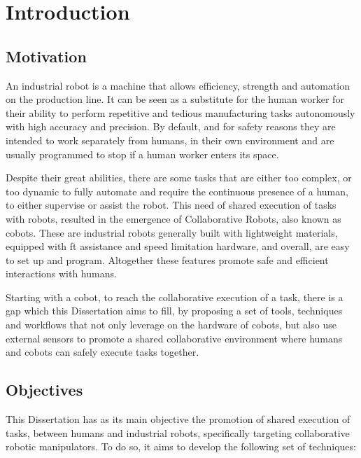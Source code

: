 \chapter{Introduction}
\label{chp:1-intro}


\section{Motivation}

\par An industrial robot is a machine that allows efficiency, strength and automation on the production line. It can be seen as a substitute for the human worker for their ability to perform repetitive and tedious manufacturing tasks autonomously with high accuracy and precision. By default, and for safety reasons they are intended to work separately from humans, in their own environment and are usually programmed to stop if a human worker enters its space.

\par Despite their great abilities, there are some tasks that are either too complex, or too dynamic to fully automate and require the continuous presence of a human, to either supervise or assist the robot. This need of shared execution of tasks with robots, resulted in the emergence of Collaborative Robots, also known as \acsp{cobot}. These are industrial robots generally built with lightweight materials, equipped with \ac{ft} assistance and speed limitation hardware, and overall, are easy to set up and program. Altogether these features promote safe and efficient interactions with humans.

\par Starting with a cobot, to reach the collaborative execution of a task, there is a gap which this Dissertation aims to fill, by proposing a set of tools, techniques and workflows that not only leverage on the hardware of cobots, but also use external sensors to promote a shared collaborative environment where humans and cobots can safely execute tasks together.


\section{Objectives}

\par This Dissertation has as its main objective the promotion of shared execution of tasks, between humans and industrial robots, specifically targeting collaborative robotic manipulators. To do so, it aims to develop the following set of techniques:

